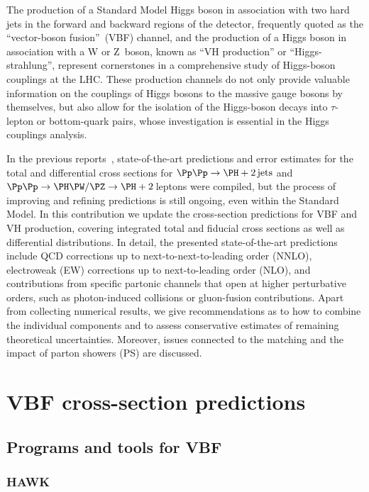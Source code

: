 The production of a Standard Model Higgs boson in association with two hard
jets in the forward and backward regions of the detector, frequently quoted
as the ``vector-boson fusion''~(VBF) channel, 
and the production of a Higgs boson in association with a W or Z~boson,
known as ``VH production'' or ``Higgs-strahlung'',
represent cornerstones in a comprehensive study of 
Higgs-boson couplings at the LHC. 
These production channels do not only provide valuable information on 
the couplings of Higgs bosons to the massive gauge bosons by themselves, but
also allow for the isolation of the Higgs-boson decays into
$\tau$-lepton or bottom-quark pairs, whose investigation is essential in
the Higgs couplings analysis.

In the previous reports~\cite{Dittmaier:2011ti,Dittmaier:2012vm,Heinemeyer:2013tqa}, 
state-of-the-art predictions and error estimates for the total and differential
cross sections for $\Pp\Pp\to\PH+ 2\,\mathrm{jets}$ and 
$\Pp\Pp\to\PH\PW/\PZ\to \PH+2\,$leptons were compiled, but the process of improving and
refining predictions is still ongoing, even within the Standard Model.
In this contribution we update the cross-section predictions for 
VBF and VH production, covering integrated total and fiducial cross sections
as well as differential distributions.
In detail, the presented state-of-the-art predictions include QCD corrections
up to next-to-next-to-leading order (NNLO), electroweak (EW) corrections
up to next-to-leading order (NLO), and contributions from specific partonic channels
that open at higher perturbative orders, such as photon-induced collisions or
gluon-fusion contributions. 
Apart from collecting numerical results, we give recommendations as to how to
combine the individual components and to assess conservative estimates of
remaining theoretical uncertainties.
Moreover, issues connected to the matching and the impact of parton
showers (PS) are discussed.


\section{VBF cross-section predictions}
\label{sec:VBF-XS}

\subsection{Programs and tools for VBF}

\subsubsection{HAWK}
\label{sec:HAWK-VBF-sub-sub}

